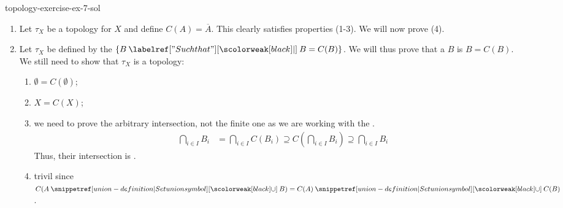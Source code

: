 \documentclass[preview]{standalone}
\begin{document}
\begin{snippetsolution}{topology-exercise-ex-7-sol}{}
    \begin{enumerate}
        \item Let \(\tau_X\) be a topology for \(X\) and define \(C(A) = \overline{A}\).
            This clearly satisfies properties (1-3).
            We will now prove (4). \\
        \item Let \(\tau_X\) be defined by the \(\{B \suchthat B = C(B)\}\).
        We will thus prove that a \set \(B\) is \closedset[closed] \ifandonlyif \(B=C(B)\).
        \\
        We still need to show that \(\tau_X\) is a topology:
        \begin{enumerate}
            \item \(\emptyset = C(\emptyset)\);
            \item \(X = C(X)\);
            \item we need to prove the arbitrary
            intersection, not the finite one as we are working with the .
            \begin{align*}
                \bigcap_{i\in I} B_i &= \bigcap_{i\in I} C(B_i) \supseteq 
                C\left(\bigcap_{i\in I} B_i\right) \supseteq \bigcap_{i\in I} B_i
            \end{align*}
            Thus, their intersection is \closedset[closed].
            \item trivil since \(C(A \union B) = C(A) \union C(B)\).
        \end{enumerate}
    \end{enumerate}
\end{snippetsolution}
\end{document}
